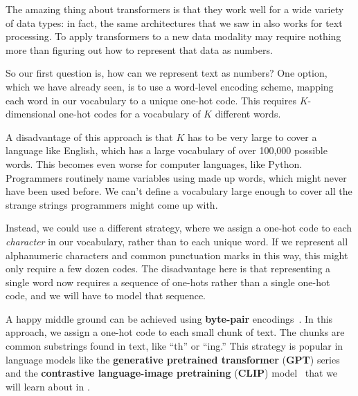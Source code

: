 The amazing thing about transformers is that they work well for a wide variety of data types: in fact, the same architectures that we saw in \chap{\ref{chapter:transformers}} also works for text processing. To apply transformers to a new data modality may require nothing more than
figuring out how to represent that data as numbers.

So our first question is, how can we represent text as numbers? One option, which we have already seen, is to use a word-level encoding scheme, mapping each word in our vocabulary to a unique one-hot code. This requires $K$-dimensional one-hot codes for a vocabulary of $K$ different words.

A disadvantage of this approach is that $K$ has to be very large to cover a language like English, which has a large vocabulary of over 100,000 possible words. This becomes even worse for computer languages, like Python. Programmers routinely name variables using made up words, which might never have been used before. We can't define a vocabulary large enough to cover all the strange strings programmers might come up with.

Instead, we could use a different strategy, where we assign a one-hot code to each \textit{character} in our vocabulary, rather than to each unique word. If we represent all alphanumeric characters and common punctuation marks in this way, this might only require a few dozen codes. The disadvantage here is that representing a single word now requires a sequence of one-hots rather than a single one-hot code, and we will have to model that sequence.

A happy middle ground can be achieved using \textbf{byte-pair} encodings~\cite{gage1994new}. In this approach, we assign a one-hot code to each small chunk of text. The chunks are common substrings found in text, like ``th'' or ``ing.'' This strategy is popular in language models like the \textbf{generative pretrained transformer} (\textbf{GPT}) series~\cite{brown2020language} and the \textbf{contrastive language-image pretraining} (\textbf{CLIP}) model~\cite{radford2021learning} that we will learn about in \sect{\ref{sec:VLMs:CLIP}}.

